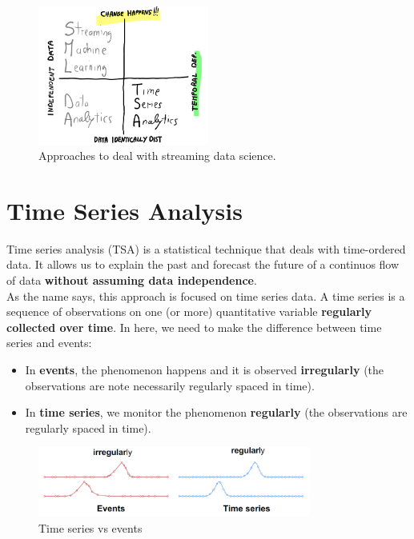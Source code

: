 \begin{figure}[H]
    \centering
    \includegraphics[width=0.5\textwidth]{figures/stream_data_science_approaches.png}
    \caption{Approaches to deal with streaming data science.}
    \label{fig:stream_data_science_approaches}
\end{figure}

\section{Time Series Analysis}

Time series analysis (TSA) is a statistical technique that deals with time-ordered data.
It allows us to explain the past and forecast the future of a continuos flow of data
\textbf{without assuming data independence}.\\

As the name says, this approach is focused on time series data. A time series is a 
sequence of observations on one (or more) quantitative variable \textbf{regularly
collected over time}. In here, we need to make the difference between time series
and events:
\begin{itemize}
    \item In \textbf{events}, the phenomenon happens and it is observed \textbf{irregularly} (the
    observations are note necessarily regularly spaced in time).

    \item In \textbf{time series}, we monitor the phenomenon \textbf{regularly} 
    (the observations are regularly spaced in time).
\end{itemize}

\begin{figure}[H]
    \centering
    \includegraphics[width=0.8\textwidth]{figures/events_vs_TS.png}
    \caption{Time series vs events}
    \label{fig:time_series_vs_events}
\end{figure}

